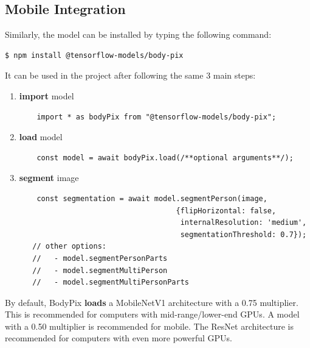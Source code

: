 \documentclass[runningheads,a4paper,11pt]{report}
\begin{document}
\subsection{Mobile Integration}
\label{section:mobileIntegration2}
Similarly, the model can be installed by typing the following command:
\begin{lstlisting}[language=bash]
    $ npm install @tensorflow-models/body-pix
\end{lstlisting}
It can be used in the project after following the same 3 main steps:
\begin{enumerate}
  \item \textbf{import} model
  \begin{lstlisting}
    import * as bodyPix from "@tensorflow-models/body-pix";
  \end{lstlisting}
  \item \textbf{load} model
  \begin{lstlisting}
    const model = await bodyPix.load(/**optional arguments**/);
  \end{lstlisting}
  \item \textbf{segment} image
  \begin{lstlisting}
    const segmentation = await model.segmentPerson(image, 
                                    {flipHorizontal: false,
                                     internalResolution: 'medium',
                                     segmentationThreshold: 0.7});
   // other options:
   //   - model.segmentPersonParts
   //   - model.segmentMultiPerson
   //   - model.segmentMultiPersonParts
  \end{lstlisting}
\end{enumerate}
By default, BodyPix \textbf{loads} a MobileNetV1 architecture with a 0.75 multiplier. This is recommended for computers with mid-range/lower-end GPUs. A model with a 0.50 multiplier is recommended for mobile. The ResNet architecture is recommended for computers with even more powerful GPUs.
\end{document}

